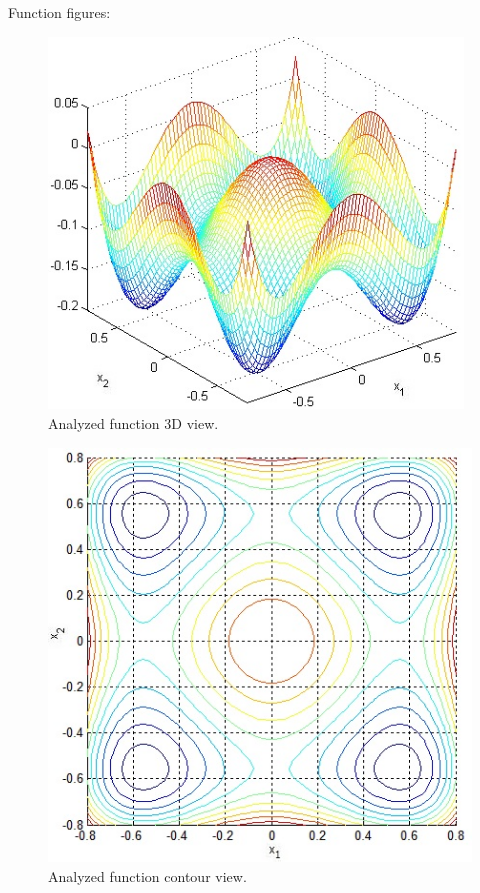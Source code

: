 \documentclass[12pt]{article}
\begin{document}
Function figures:
	\begin{figure}[H]
		\begin{center}
			\includegraphics[width=11cm]{four_3d.jpg}
		\caption{Analyzed function 3D view.}
		\end{center}
	\end{figure}
	\begin{figure}[H]
		\begin{center}
			\includegraphics[width=12cm]{four_cont.jpg}
			\caption{Analyzed function contour view.}
		\end{center}
	\end{figure}	
\end{document}
